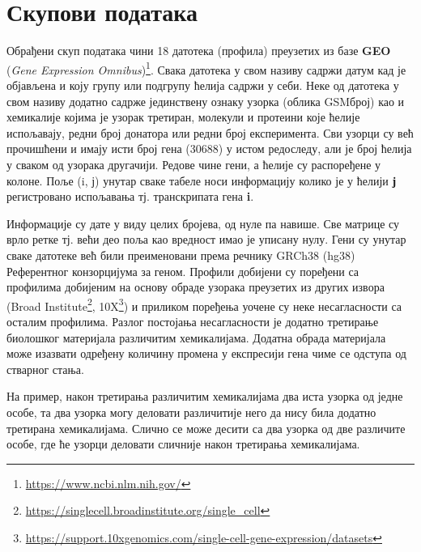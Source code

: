\documentclass[10pt, a4paper]{article}
\begin{document}
\section{Скупови података}
\label{sec: naslov2}

Обрађени скуп података чини 18 датотека (профила) преузетих из базе \textbf{GEO} ({\em Gene Expression Omnibus})\footnote{\url{https://www.ncbi.nlm.nih.gov/}}. Свака датотека у свом називу садржи датум кад је објављена и коју групу или подгрупу ћелија садржи у себи. Неке од датотека у свом називу додатно садрже јединствену ознаку узорка (облика GSMброј) као и хемикалије којима је узорак третиран, молекули и протеини које ћелије испољавају, редни број донатора или редни број експеримента. Сви узорци су већ прочишћени и имају исти број гена (30688) у истом редоследу, али је број ћелија у сваком од узорака другачији. Редове чине гени, а ћелије су распоређене у колоне. Поље (i, ј) унутар сваке табеле носи информацију колико је у ћелији \textbf{ј} регистровано испољавања тј. транскрипата гена \textbf{i}.

Информације су дате у виду целих бројева, од нуле па навише. Све матрице су врло ретке тј. већи део поља као вредност имао је уписану нулу. Гени су унутар сваке датотеке већ били преименовани према речнику GRCh38 (hg38) Референтног конзорцијума за геном.  Профили добијени су поређени са профилима добијеним на основу обраде узорака преузетих из других извора (Broad Institute\footnote{\url{https://singlecell.broadinstitute.org/single\_cell}}, 10X\footnote{\url{https://support.10xgenomics.com/single-cell-gene-expression/datasets}}) и приликом поређења уочене су неке несагласности са осталим профилима. Разлог постојања несагласности је додатно третирање биолошког материјала различитим хемикалијама. Додатна обрада материјала може изазвати одређену количину промена у експресији гена чиме се одступа од стварног стања. 

На пример, након третирања различитим хемикалијама два иста узорка од једне особе, та два узорка могу деловати различитије него да нису била додатно третирана хемикалијама. Слично се може десити са два узорка од две различите особе, где ће узорци деловати сличније након третирања хемикалијама.
\end{document}
